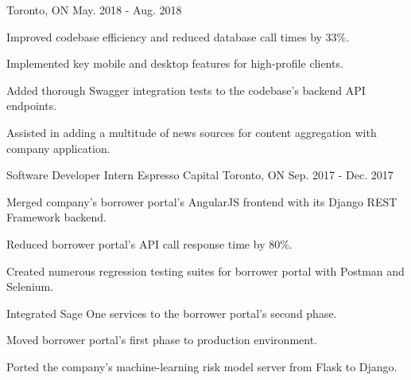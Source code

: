 \begin{cventries}
    {Toronto, ON}
    {May. 2018 - Aug. 2018}
    {
      \begin{cvitems}
        \item {Improved codebase efficiency and reduced database call times by 33\%.}
        \item {Implemented key mobile and desktop features for high-profile clients.}
        \item {Added thorough Swagger integration tests to the codebase's backend API endpoints.}
        \item {Assisted in adding a multitude of news sources for content aggregation with company application.}
      \end{cvitems}
    }
  \cventry
    {Software Developer Intern}
    {Espresso Capital}
    {Toronto, ON}
    {Sep. 2017 - Dec. 2017}
    {
      \begin{cvitems}
        \item {Merged company's borrower portal's AngularJS frontend with its Django REST Framework backend.}
        \item {Reduced borrower portal's API call response time by 80\%.}
        \item {Created numerous regression testing suites for borrower portal with Postman and Selenium.}
        \item {Integrated Sage One services to the borrower portal's second phase.}
        \item {Moved borrower portal's first phase to production environment.}
        \item {Ported the company's machine-learning risk model server from Flask to Django.}
      \end{cvitems}
    }
\end{cventries}
